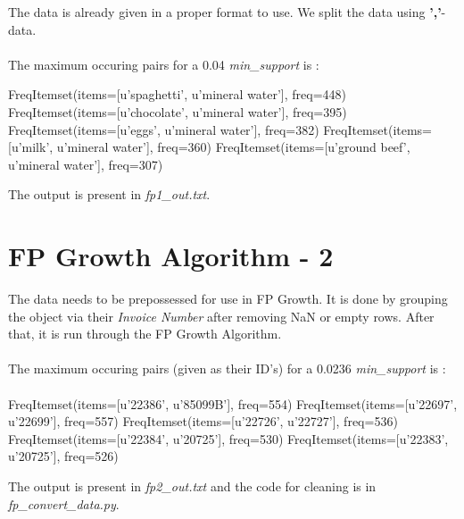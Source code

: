 \documentclass{article}
\begin{document}
The data is already given in a proper format to use. We split the data using \textbf{','}-data.

\paragraph{}

The maximum occuring pairs for a 0.04 \emph{min\_support} is :
\vspace{0.5em}

\begin{center}

    FreqItemset(items=[u'spaghetti', u'mineral water'], freq=448)\newline
    FreqItemset(items=[u'chocolate', u'mineral water'], freq=395)\newline
    FreqItemset(items=[u'eggs', u'mineral water'], freq=382) \newline
    FreqItemset(items=[u'milk', u'mineral water'], freq=360)\newline
    FreqItemset(items=[u'ground beef', u'mineral water'], freq=307)\newline
\end{center}

The output is present in \emph{fp1\_out.txt}.

\section*{FP Growth Algorithm - 2}

The data needs to be prepossessed for use in FP Growth. It is done by grouping the object via their \emph{Invoice Number} after removing NaN or empty rows. After that, it is run through the FP Growth Algorithm. 
\paragraph{}

The maximum occuring pairs (given as their ID's) for a 0.0236 \emph{min\_support} is :
\vspace{0.5em}


\paragraph{}

\begin{center}
    FreqItemset(items=[u'22386', u'85099B'], freq=554)\newline
    FreqItemset(items=[u'22697', u'22699'], freq=557)\newline
    FreqItemset(items=[u'22726', u'22727'], freq=536)\newline
    FreqItemset(items=[u'22384', u'20725'], freq=530) \newline
    FreqItemset(items=[u'22383', u'20725'], freq=526)\newline
\end{center}

The output is present in \emph{fp2\_out.txt} and the code for cleaning is in \emph{fp\_convert\_data.py}.
\end{document}
